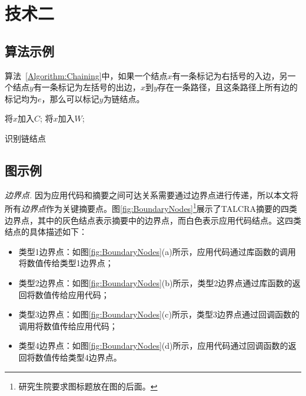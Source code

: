 
\chapter{技术二}\label{chapter:tal}

\section{算法示例}

算法~\ref{Algorithm:Chaining}中，如果一个结点$x$有一条标记为右括号的入边，另一个结点$y$有一条标记为左括号的出边，$x$到$y$存在一条路径，且这条路径上所有边的标记均为$e$，那么可以标记$y$为链结点。

\begin{algorithm} [ht]
 {
将$x$加入$C$; 将$x$加入$W$;
}
\caption{识别链结点}
\label{Algorithm:Chaining}
\end{algorithm}

\section{图示例}

\textit{边界点.}
因为应用代码和摘要之间可达关系需要通过边界点进行传递，所以本文将所有\textit{边界点}作为关键摘要点。图\ref{fig:BoundaryNodes}\footnote{研究生院要求图标题放在图的后面。}展示了TALCRA摘要的四类边界点，其中的灰色结点表示摘要中的边界点，而白色表示应用代码结点。这四类结点的具体描述如下：
\begin{itemize}
\item 类型1边界点：如图\ref{fig:BoundaryNodes}(a)所示，应用代码通过库函数的调用将数值传给类型1边界点；
\item 类型2边界点：如图\ref{fig:BoundaryNodes}(b)所示，类型2边界点通过库函数的返回将数值传给应用代码；
\item 类型3边界点：如图\ref{fig:BoundaryNodes}(c)所示，类型3边界点通过回调函数的调用将数值传给应用代码；
\item 类型4边界点：如图\ref{fig:BoundaryNodes}(d)所示，应用代码通过回调函数的返回将数值传给类型4边界点。
\end{itemize}

